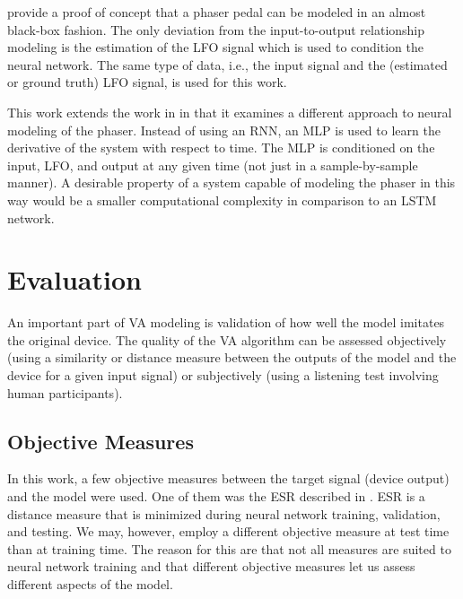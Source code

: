 \cite{Wright2020} provide a proof of concept that a phaser pedal can be modeled in an almost black-box fashion. The only deviation from the input-to-output relationship modeling is the estimation of the \ac{LFO} signal which is used to condition the neural network. The same type of data, i.e., the input signal and the (estimated or ground truth) \ac{LFO} signal, is used for this work.

This work extends the work in \cite{Wright2020} in that it examines a different approach to neural modeling of the phaser. Instead of using an \ac{RNN}, an \ac{MLP} is used to learn the derivative of the system with respect to time. The \ac{MLP} is conditioned on the input, \ac{LFO}, and output at any given time (not just in a sample-by-sample manner). A desirable property of a system capable of modeling the phaser in this way would be a smaller computational complexity in comparison to an \ac{LSTM} network.


\section{Evaluation}
\label{subsec:va_evaluation}

An important part of \ac{VA} modeling is validation of how well the model imitates the original device. The quality of the \ac{VA} algorithm can be assessed objectively (using a similarity or distance measure between the outputs of the model and the device for a given input signal) or subjectively (using a listening test involving human participants).

\subsection*{Objective Measures}
\label{subsubsec:va_objective_measures}

In this work, a few objective measures between the target signal (device output) and the model were used. One of them was the \ac{ESR} described in .
\ac{ESR} is a distance measure that is minimized during neural network training, validation, and testing. We may, however, employ a different objective measure at test time than at training time. The reason for this are that not all measures are suited to neural network training and that different objective measures let us assess different aspects of the model.


